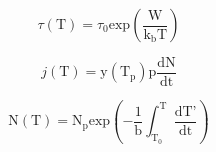 \begin{equation}
\tau \left( \text{T} \right) = \tau_0  \text{exp} \left(\frac{\text{W}}{\text{k}_{\text{b}}\text{T}}\right) 
\label{eqn:relaxo}
\end{equation}

\begin{equation}
j \left( \text{T} \right) = \text{y} \left( \text{T}_{\text{p}}\right) \text{p} \frac{\text{dN}}{\text{dt}}
\label{eqn:dichte}
\end{equation}

\begin{equation}
\text{N}\left( \text{T} \right) = \text{N}_{\text{p}} \text{exp} \left( - \frac{1}{\text{b}} \int^{\text{T}}_{\text{T}_0} \frac{\text{dT'}}{\text{dt}}\right)
\label{eqn:orientierung}
\end{equation}





